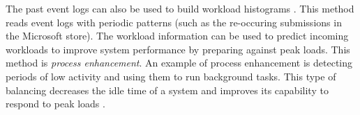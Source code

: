 The past event logs can also be used to build workload histograms \cite{getta2014mining}.
This method reads event logs with periodic patterns (such as the re-occuring submissions in the Microsoft store).
The workload information can be used to predict incoming workloads to improve system performance by preparing against peak loads.
This method is \textit{process enhancement}. 
An example of process enhancement is detecting periods of low activity and using them to run background tasks.
This type of balancing decreases the idle time of a system and improves its capability to respond to peak loads \cite{getta2014mining}.

